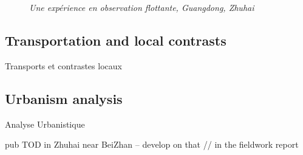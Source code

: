 \bigskip


\begin{figure}[h!]
\begin{mdframed}

 \textit{Une expérience en observation flottante, Guangdong, Zhuhai}
\end{mdframed}
\end{figure}





\subsection{Transportation and local contrasts}{Transports et contrastes locaux}





\subsection{Urbanism analysis}{Analyse Urbanistique}



pub TOD in Zhuhai near BeiZhan -- develop on that // in the fieldwork report














